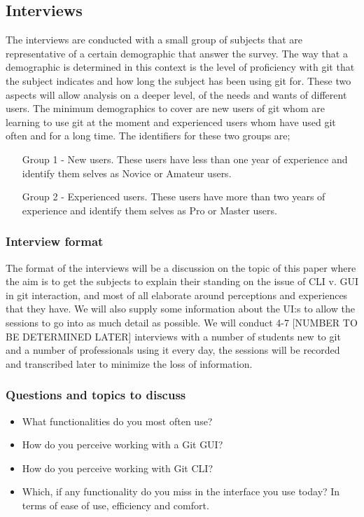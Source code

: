 \documentclass[a4paper,oneside]{bth} %
\begin{document}
				
				\subsection{Interviews}
				The interviews are conducted with a small group of subjects that are representative of a certain demographic that answer the survey. The way that a demographic is determined in this context is the level of proficiency with git that the subject indicates and how long the subject has been using git for. 
				These two aspects will allow analysis on a deeper level, of the needs and wants of different users. The minimum demographics to cover are new users of git whom are learning to use git at the moment and experienced users whom have used git often and for a long time. The identifiers for these two groups are;
				\begin{itemize}
					\item[Group 1 - New users.]
					These users have less than one year of experience and identify them selves as Novice or Amateur users.
					\item[Group 2 - Experienced users.]
					These users have more than two years of experience and identify them selves as Pro or Master users.
				\end{itemize}
					\subsubsection*{Interview format}
					The format of the interviews will be a discussion on the topic of this paper where the aim is to get the subjects to explain their standing on the issue of CLI v. GUI in git interaction, and most of all elaborate around perceptions and experiences that they have. We will also supply some information about the UI:s to allow the sessions to go into as much detail as possible. 
					We will conduct 4-7 [NUMBER TO BE DETERMINED LATER] interviews with a number of students new to git and a number of professionals using it every day, the sessions will be recorded and transcribed later to minimize the loss of information.
					
					\subsubsection*{Questions and topics to discuss}
						\begin{itemize}
							\item What functionalities do you most often use?
							\item How do you perceive working with a Git GUI?
							\item How do you perceive working with Git CLI?
							\item Which, if any functionality do you miss in the interface you use today? In terms of ease of use, efficiency and comfort.
						\end{itemize}
						
\end{document}
